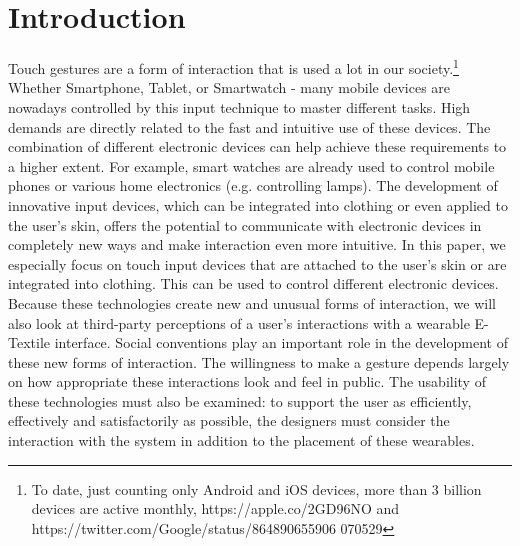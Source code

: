 \documentclass{sigchi}
\begin{document}
\section{Introduction}
%

Touch gestures are a form of interaction that is used a lot in our society.\footnote{To date, just counting only Android and iOS devices, more than 3 billion devices are active monthly, https://apple.co/2GD96NO and https://twitter.com/Google/status/864890655906
070529} Whether Smartphone, Tablet, or Smartwatch - many mobile devices are nowadays controlled by this input technique to master different tasks. High demands are directly related to the fast and intuitive use of these devices. The combination of different electronic devices can help achieve these requirements to a higher extent. For example, smart watches are already used to control mobile phones or various home electronics (e.g. controlling lamps). The development of innovative input devices, which can be integrated into clothing or even applied to the user's skin, offers the potential to communicate with electronic devices in completely new ways and make interaction even more intuitive. In this paper, we especially focus on touch input devices that are attached to the user's skin or are integrated into clothing. This can be used to control different electronic devices.
Because these technologies create new and unusual forms of interaction, we will also look at third-party perceptions of a user’s interactions with a wearable E-Textile interface. Social conventions play an important role in the development of these new forms of interaction. The willingness to make a gesture depends largely on how appropriate these interactions look and feel in public. \cite{touch-wrist} The usability of these technologies must also be examined: to support the user as efficiently, effectively and satisfactorily as possible, the designers must consider the interaction with the system in addition to the placement of these wearables.

\end{document}
